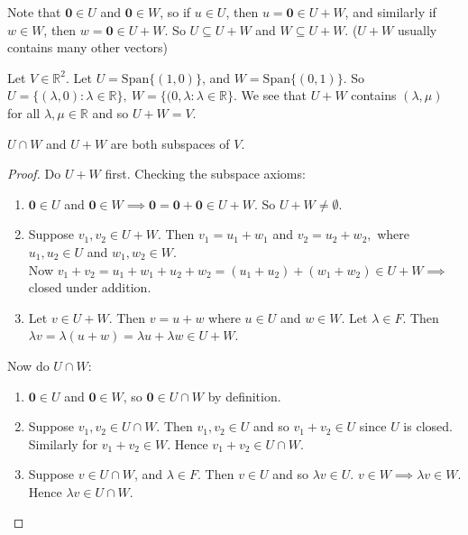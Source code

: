 \documentclass[10pt]{scrartcl}
\begin{document}
\begin{remark}  Note that $\mathbf{0} \in U$ and $\mathbf{0} \in W$, so if $u \in U$, then $u = \mathbf{0} \in U + W$, and similarly if  $w \in W$, then $w = \mathbf{0} \in U + W$. So $U \subseteq U + W$ and $W \subseteq U + W$. ($U+W$ usually contains many other vectors)
\end{remark}\vspace*{10pt}

\begin{example} Let $V \in \mathbb{R}^2.$ Let $U = \text{Span}\{(1,0)\}$, and  $W = \text{Span}\{(0,1)\}$. So $U = \{(\lambda, 0): \lambda \in \mathbb{R}\}, ~W = \{(0,\lambda: \lambda \in \mathbb{R}\}$. We see that $U + W$ contains $(\lambda, \mu)$ for all $\lambda, \mu \in \mathbb{R}$ and so $U + W = V$.
\end{example}\vspace*{5pt}



\begin{proposition} $U \cap W$ and $U + W$ are both subspaces of $V$. 	
\end{proposition}

\begin{proof}
Do $U+W$ first. Checking the subspace axioms:
\begin{enumerate}
\item  $\mathbf{0} \in U$ and $\mathbf{0} \in W \implies \mathbf{0} = \mathbf{0} + \mathbf{0} \in U + W$. So $U + W \neq \emptyset$. 
\item Suppose $v_1, v_2 \in U + W$. Then $v_1 = u_1 + w_1$ and $v_2 = u_2 + w_2,$ where $u_1,u_2 \in U$ and $w_1, w_2 \in W$.\\

Now $v_1 + v_2 = u_1 + w_1 + u_2 + w_2 = (u_1 + u_2) + (w_1 + w_2) \in U + W \implies$ closed under addition.

\item Let $v \in U + W$. Then $v = u + w$ where $u \in U$ and $w \in W.$ Let $\lambda \in F$. Then $\lambda v = \lambda(u+w) = \lambda u + \lambda w \in U + W$.
\end{enumerate}

Now do $U \cap W$:
\begin{enumerate}
\item $\mathbf{0} \in U$ and $\mathbf{0} \in W$, so $\mathbf{0} \in U \cap W$ by definition.
\item Suppose $v_1, v_2 \in U \cap W.$ Then $v_1, v_2 \in U$ and so $v_1 + v_2 \in U$ since $U$ is closed. Similarly for $v_1 + v_2 \in W$. Hence $v_1 + v_2 \in U \cap W$. 
\item Suppose $v \in U \cap W$, and $\lambda \in F.$ Then $v \in U$ and so $\lambda v \in U$. $v \in W \implies \lambda v \in W.$ Hence $\lambda v \in U \cap W$.\qedhere 
\end{enumerate}
\end{proof}\vspace*{10pt}
\end{document}
